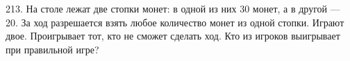 213. На столе лежат две стопки монет: в одной из них 30 монет, а в другой --- 20. За ход разрешается взять любое количество монет из одной стопки. Играют двое. Проигрывает тот, кто не сможет сделать ход. Кто из игроков выигрывает при правильной игре?\\
